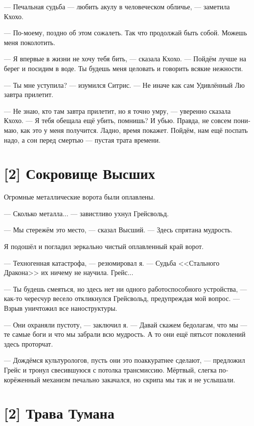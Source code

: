 \documentclass[a4paper,12pt,fleqn]{book}\usepackage{polyglossia}\setdefaultlanguage[babelshorthands=true]{russian}\setotherlanguage{english}\defaultfontfeatures{Ligatures=TeX,Mapping=tex-text}\usepackage{xcolor}\newcommand{\ml}[3]{#2}
\begin{document}
{--- Печальная судьба --- любить акулу в человеческом обличье, --- заметила Кхохо.

--- По-моему, поздно об этом сожалеть.
Так что продолжай быть собой.
Можешь меня поколотить.

--- Я впервые в жизни не хочу тебя бить, --- сказала Кхохо.
--- Пойдём лучше на берег и посидим в воде.
Ты будешь меня целовать и говорить всякие нежности.

--- Ты мне уступила? --- изумился Ситрис.
--- Не иначе как сам Удивлённый Лю завтра прилетит.

--- Не знаю, кто там завтра прилетит, но я точно умру, --- уверенно сказала Кхохо.
--- Я тебя обещала ещё убить, помнишь?
И убью.
Правда, не совсем понимаю, как это у меня получится.
Ладно, время покажет.
Пойдём, нам ещё поспать надо, а сон перед смертью --- пустая трата времени.

\section{[2] Сокровище Высших}

Огромные металлические ворота были оплавлены.

--- Сколько металла... --- завистливо ухнул Грейсвольд.

--- Мы стережём это место, --- сказал Высший.
--- Здесь спрятана мудрость.

Я подошёл и погладил зеркально чистый оплавленный край ворот.

--- Техногенная катастрофа, --- резюмировал я.
--- Судьба <<Стального Дракона>> их ничему не научила.
Грейс...

--- Ты будешь смеяться, но здесь нет ни одного работоспособного устройства, --- как-то чересчур весело откликнулся Грейсвольд, предупреждая мой вопрос.
--- Взрыв уничтожил все наноструктуры.

--- Они охраняли пустоту, --- заключил я.
--- Давай скажем бедолагам, что мы --- те самые боги и что мы забрали всю мудрость.
А то они ещё пятьсот поколений здесь проторчат.

--- Дождёмся культурологов, пусть они это поаккуратнее сделают, --- предложил Грейс и тронул свесившуюся с потолка трансмиссию.
Мёртвый, слегка покорёженный механизм печально закачался, но скрипа мы так и не услышали.

\section{[2] Трава Тумана}

}
\end{document}
